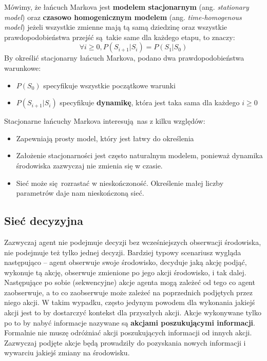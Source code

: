 \documentclass[a4paper, 12pt,oneside]{book}
\begin{document}
Mówimy, że łańcuch Markova jest \textbf{modelem stacjonarnym} (ang.
\textit{stationary model}) oraz \textbf{czasowo homogenicznym modelem} (ang.
\textit{time-homogenous model}) jeżeli wszystkie zmienne mają tą samą dziedzinę
oraz wszystkie prawdopodobieństwa przejść są takie same dla każdego etapu, to
znaczy:
\[\forall i \ge 0, P(S_{i+1}|S_i) = P(S_1|S_0)\]
By określić stacjonarny łańcuch Markova, podano dwa prawdopodobieństwa
warunkowe:
\begin{itemize}
		\setlength\itemsep{-0.4em}
	\item $P(S_0)$ specyfikuje wszystkie początkowe warunki
	\item $P(S_{i+1} | S_i)$ specyfikuje \textbf{dynamikę}, która jest taka
		sama dla każdego $i \ge 0$
\end{itemize}
Stacjonarne łańcuchy Markova interesują nas z kilku względów:
\begin{itemize}
		\setlength\itemsep{-0.4em}
	\item Zapewniają prosty model, który jest łatwy do określenia
	\item Założenie stacjonarności jest często naturalnym modelem, ponieważ
		dynamika środowiska zazwyczaj nie zmienia się w czasie.
	\item Sieć może się rozrastać w nieskończoność. Określenie małej liczby
		parametrów daje nam nieskończoną
		sieć\cite{ai_foundations_markov_chains}.
\end{itemize}

\subsection{Sieć decyzyjna}
Zazwyczaj agent nie podejmuje decyzji bez wcześniejszych obserwacji środowiska,
nie podejmuje też tylko jednej decyzji. Bardziej typowy scenariusz wygląda
następująco -- agent obserwuje swoje środowisko, decyduje jaką akcję podjąć,
wykonuje tą akcję, obserwuje zmienione po jego akcji środowisko, i tak dalej.
Następujące po sobie (sekwencyjne) akcje agenta mogą zależeć od tego co agent
zaobserwuje, a to co zaobserwuje może zależeć na poprzednich podjętych przez
niego akcji. W takim wypadku, często jedynym powodem dla wykonania jakiejś
akcji jest to by dostarczyć kontekst dla przyszłych akcji. Akcje wykonywane
tylko po to by nabyć informacje nazywane są \textbf{akcjami poszukującymi
informacji}. Formalnie nie muszę odróżniać akcji poszukujących informacji od
innych akcji. Zazwyczaj podjęte akcje będą prowadziły do pozyskania nowych
informacji i wywarciu jakiejś zmiany na środowisku.
\end{document}
